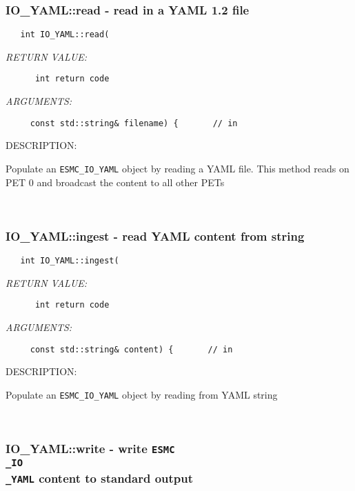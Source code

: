 \subsubsection [IO\_YAML::read] {IO\_YAML::read - read in a YAML 1.2 file}


  
\begin{verbatim}   int IO_YAML::read(\end{verbatim}{\em RETURN VALUE:}
\begin{verbatim}      int return code\end{verbatim}{\em ARGUMENTS:}
\begin{verbatim}     const std::string& filename) {       // in
 \end{verbatim}
{\sf DESCRIPTION:\\ }


        Populate an {\tt ESMC\_IO\_YAML} object by reading a YAML file.
        This method reads on PET 0 and broadcast the content to all
        other PETs
   
 
\mbox{}\hrulefill\
 
\subsubsection [IO\_YAML::ingest] {IO\_YAML::ingest - read YAML content from string}


  
\begin{verbatim}   int IO_YAML::ingest(\end{verbatim}{\em RETURN VALUE:}
\begin{verbatim}      int return code\end{verbatim}{\em ARGUMENTS:}
\begin{verbatim}     const std::string& content) {       // in
 \end{verbatim}
{\sf DESCRIPTION:\\ }


        Populate an {\tt ESMC\_IO\_YAML} object by reading from YAML string
   
 
\mbox{}\hrulefill\
 
\subsubsection [IO\_YAML::write] {IO\_YAML::write - write {\tt ESMC\\_IO\\_YAML} content to standard output}


